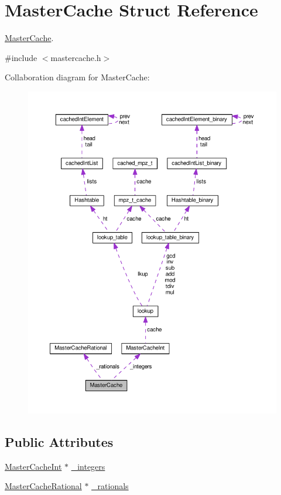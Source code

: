 \hypertarget{structMasterCache}{}\section{Master\+Cache Struct Reference}
\label{structMasterCache}


\hyperlink{structMasterCache}{Master\+Cache}.  




{\ttfamily \#include $<$mastercache.\+h$>$}



Collaboration diagram for Master\+Cache\+:\nopagebreak
\begin{figure}[H]
\begin{center}
\leavevmode
\includegraphics[width=350pt]{structMasterCache__coll__graph}
\end{center}
\end{figure}
\subsection*{Public Attributes}
\begin{DoxyCompactItemize}
\item 
\hyperlink{structMasterCacheInt}{Master\+Cache\+Int} $\ast$ \hyperlink{structMasterCache_a5c3a0aa848b8d98114902f674e111dc3}{\+\_\+integers}
\item 
\hyperlink{structMasterCacheRational}{Master\+Cache\+Rational} $\ast$ \hyperlink{structMasterCache_a2cc414dcdfc90d3841ffa329f0877f67}{\+\_\+rationals}
\end{DoxyCompactItemize}


